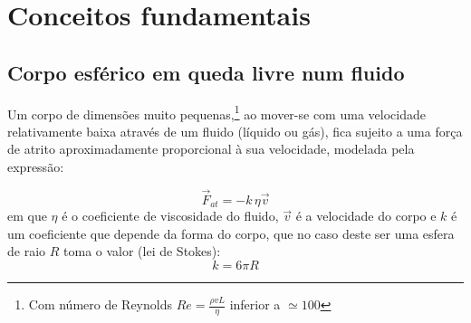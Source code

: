 \documentclass[12pt,a4paper,oneside]{paper}
\begin{document}
\pagestyle{fancy}
\fancyhf{} %

%
% 



\def\title {}


%
% 

 
\normalsize
\cleardoublepage
\setcounter{page}{1}
\selectfont
%
%

\printindex


\section{\sf Conceitos fundamentais}
\subsection{\sf Corpo esférico em queda livre num fluido}
Um corpo de dimensões muito pequenas,\footnote{Com número de Reynolds $Re= \frac{\rho v L}{\eta}$ inferior a $\simeq 100$} 
ao mover-se com uma velocidade relativamente baixa através de um fluido (líquido ou gás), fica sujeito a uma força de atrito
aproximadamente proporcional à sua velocidade, modelada pela expressão:

\begin{equation}
	\label{eq:f_atrito}
	\vec{F}_{at} = - k \, \eta \vec{v}
\end{equation}
em que $\eta$ é o coeficiente de viscosidade do fluido, $\vec{v}$ é a velocidade do corpo e $k$ é um coeficiente que depende
da forma do corpo, que no caso deste ser uma esfera de raio $R$ toma o valor (lei de Stokes): 
\begin{equation}
	\label{eq:coef_atrito}
	k = 6 \pi R
\end{equation}
\end{document}
